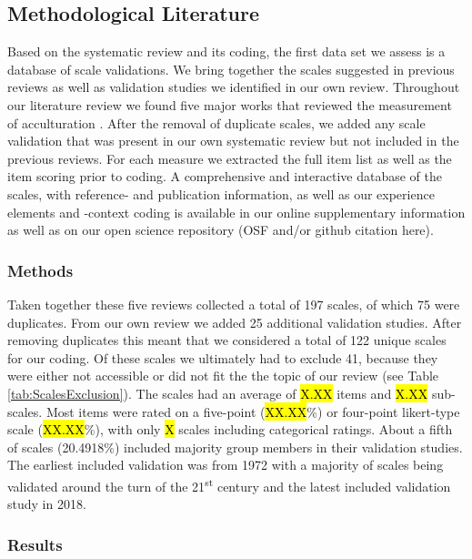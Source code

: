 \subsection{Methodological Literature}

Based on the systematic review and its coding, the first data set we
assess is a database of scale validations. We bring together the scales
suggested in previous reviews as well as validation studies we
identified in our own review. Throughout our literature review we found
five major works that reviewed the measurement of acculturation
\citep{Celenk2011, Maestas2000, Matsudaira2006, Wallace2010, Zane2004}.
After the removal of duplicate scales, we added any scale validation
that was present in our own systematic review but not included in the
previous reviews. For each measure we extracted the full item list as
well as the item scoring prior to coding. A comprehensive and
interactive database of the scales, with reference- and publication
information, as well as our experience elements and -context coding is
available in our online supplementary information as well as on our open
science repository (OSF and/or github citation here).

\subsubsection{Methods}

Taken together these five reviews collected a total of 197 scales, of
which 75 were duplicates. From our own review we added 25 additional
validation studies. After removing duplicates this meant that we
considered a total of 122 unique scales for our coding. Of these scales
we ultimately had to exclude 41, because they were either not accessible
or did not fit the the topic of our review (see Table
\ref{tab:ScalesExclusion}). The scales had an average of \hl{X.XX} items
and \hl{X.XX} sub-scales. Most items were rated on a five-point
(\hl{XX.XX}\%) or four-point likert-type scale (\hl{XX.XX}\%), with only
\hl{X} scales including categorical ratings. About a fifth of scales
(20.4918\%) included majority group members in their validation studies.
The earliest included validation was from 1972 with a majority of scales
being validated around the turn of the 21\textsuperscript{st} century
and the latest included validation study in 2018.



\subsubsection{Results}

